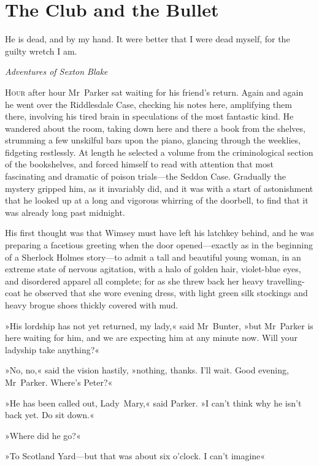 


\chapter{The Club and the Bullet}

\epigraph{He is dead, and by my hand. It were better that I were dead myself, for the guilty wretch I am.}{\textit{Adventures of Sexton Blake}}


\lettrine[lines=4]{H}{our} after hour Mr~Parker sat waiting for his friend's return. Again and again he went over the Riddlesdale Case, checking his notes here, amplifying them there, involving his tired brain in speculations of the most fantastic kind. He wandered about the room, taking down here and there a book from the shelves, strumming a few unskilful bars upon the piano, glancing through the weeklies, fidgeting restlessly.  At length he selected a volume from the criminological section of the bookshelves, and forced himself to read with attention that most fascinating and dramatic of poison trials—the Seddon Case. Gradually the mystery gripped him, as it invariably did, and it was with a start of astonishment that he looked up at a long and vigorous whirring of the doorbell, to find that it was already long past midnight.

His first thought was that Wimsey must have left his latchkey behind, and he was preparing a facetious greeting when the door opened—exactly as in the beginning of a Sherlock Holmes story—to admit a tall and beautiful young woman, in an extreme state of nervous agitation, with a halo of golden hair, violet-blue eyes, and disordered apparel all complete; for as she threw back her heavy travelling-coat he observed that she wore evening dress, with light green silk stockings and heavy brogue shoes thickly covered with mud.

»His lordship has not yet returned, my lady,« said Mr~Bunter, »but Mr~Parker is here waiting for him, and we are expecting him at any minute now. Will your ladyship take anything?«

»No, no,« said the vision hastily, »nothing, thanks. I'll wait. Good evening, Mr~Parker. Where's Peter?«

»He has been called out, Lady~Mary,« said Parker. »I can't think why he isn't back yet. Do sit down.«

»Where did he go?«

»To Scotland Yard—but that was about six o'clock. I can't imagine\longdash«


